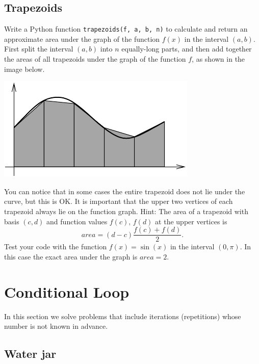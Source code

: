 
\subsection{Trapezoids}\label{exe:trap}

Write a Python function {\tt trapezoids(f, a, b, n)} to calculate and return  
an approximate area under the graph of the function $f(x)$ in the interval $(a, b)$. 
First split the interval $(a, b)$ into $n$
equally-long parts, and then add together the areas of all trapezoids under the 
graph of the function $f$, as shown in the image below. 

\begin{center}
\includegraphics[height=0.3\textwidth]{img/riem.pdf}
\end{center}
\noindent
You can notice that in some cases the entire trapezoid does not lie 
under the curve, but this is OK. It is important that the upper two vertices 
of each trapezoid always lie on the function graph.
Hint: The area of a trapezoid with basis $(c, d)$ and function 
values $f(c),\, f(d)$ at the upper vertices is 
$$
area = (d - c)\frac{f(c) + f(d)}{2}.
$$
Test your code with the function $f(x) = \sin(x)$ in the interval $(0, \pi)$.
In this case the exact area under the graph is $area = 2$.


\section{Conditional Loop}

In this section we solve problems that include iterations (repetitions) whose
number is not known in advance.


\subsection{Water jar}

